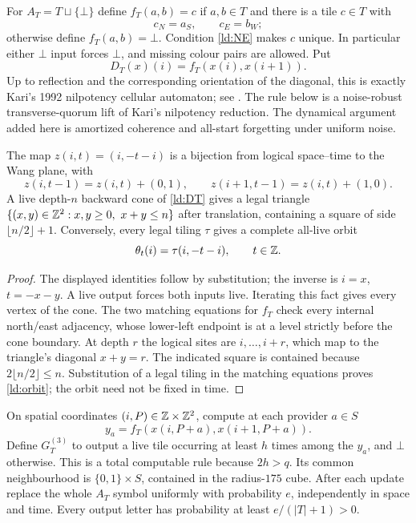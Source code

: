 For $A_T=T\sqcup\{\bot\}$ define $f_T(a,b)=c$ if $a,b\in T$ and there is a tile $c\in T$ with
\[
 c_N=a_S,\qquad c_E=b_W;
\]
otherwise define $f_T(a,b)=\bot$. Condition \eqref{ld:NE} makes $c$ unique. In particular either $\bot$ input forces $\bot$, and missing colour pairs are allowed. Put
\begin{equation}\label{ld:DT}
 D_T(x)(i)=f_T(x(i),x(i+1)).
\end{equation}
Up to reflection and the corresponding orientation of the diagonal, this is exactly Kari's 1992 nilpotency cellular automaton; see \cite[discussion after Theorem~15, p.~24]{Kari05}. The rule below is a noise-robust transverse-quorum lift of Kari's nilpotency reduction. The dynamical argument added here is amortized coherence and all-start forgetting under uniform noise.

\begin{lemma}\label{ld:geometry}
The map $z(i,t)=(i,-t-i)$ is a bijection from logical space--time to the Wang plane, with
\[
 z(i,t-1)=z(i,t)+(0,1),\qquad
 z(i+1,t-1)=z(i,t)+(1,0).
\]
A live depth-$n$ backward cone of \eqref{ld:DT} gives a legal triangle
$\{(x,y)\in\mathbb{Z}^2:x,y\ge0,\ x+y\le n\}$ after translation, containing a square of side $\lfloor n/2\rfloor+1$. Conversely, every legal tiling $\tau$ gives a complete all-live orbit
\begin{equation}\label{ld:orbit}
 \theta_t(i)=\tau(i,-t-i),\qquad t\in\mathbb{Z}.
\end{equation}
\end{lemma}
\begin{proof}
The displayed identities follow by substitution; the inverse is $i=x$, $t=-x-y$. A live output forces both inputs live. Iterating this fact gives every vertex of the cone. The two matching equations for $f_T$ check every internal north/east adjacency, whose lower-left endpoint is at a level strictly before the cone boundary. At depth $r$ the logical sites are $i,\ldots,i+r$, which map to the triangle's diagonal $x+y=r$. The indicated square is contained because $2\lfloor n/2\rfloor\le n$. Substitution of a legal tiling in the matching equations proves \eqref{ld:orbit}; the orbit need not be fixed in time.
\end{proof}

On spatial coordinates $(i,P)\in\mathbb{Z}\times\mathbb{Z}^2$, compute at each provider $a\in S$
\[
 y_a=f_T(x(i,P+a),x(i+1,P+a)).
\]
Define $G_T^{(3)}$ to output a live tile occurring at least $h$ times among the $y_a$, and $\bot$ otherwise. This is a total computable rule because $2h>q$. Its common neighbourhood is $\{0,1\}\times S$, contained in the radius-$175$ cube. After each update replace the whole $A_T$ symbol uniformly with probability $e$, independently in space and time. Every output letter has probability at least $e/(|T|+1)>0$.

